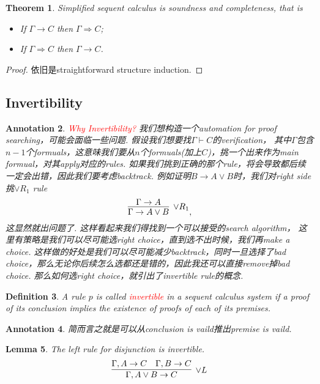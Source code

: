 \documentclass{article}
\theoremstyle{plain}
\newtheorem{theorem}{Theorem}
\newtheorem{lemma}[theorem]{Lemma}
\newtheorem{definition}[theorem]{Definition}
\newtheorem{annotation}[theorem]{Annotation}
\theoremstyle{nonumberplain}
\newtheorem{proof}{Proof}
\newcommand{\redt}[1]{\textcolor{red}{#1}}
\begin{document}
\begin{theorem}
\rm Simplified sequent calculus is soundness and completeness, that is
\begin{itemize}
	\item If $\Gamma \to C$ then $\Gamma \Rightarrow C$;
	\item If $\Gamma \Rightarrow C$ then $\Gamma \to C$.
\end{itemize}
\end{theorem}

\begin{proof}
依旧是straightforward structure induction.
\end{proof}



\newpage
\subsection{Invertibility}

\begin{annotation}
 \rm \redt{Why Invertibility?} \cite{15-317-inv} 我们想构造一个automation for proof searching，可能会面临一些问题. 假设我们想要找$\Gamma \vdash C$的verification， 其中$\Gamma$包含$n-1$个formuals，这意味我们要从$n$个formuals(加上$C$)，挑一个出来作为main formual，对其apply对应的rules. 如果我们挑到正确的那个rule，将会导致都后续一定会出错，因此我们要考虑backtrack. 例如证明$B \to A \vee B$时，我们对right side挑$\vee R_1$ rule
$$
\infer[\vee R_1]{\Gamma \to A \vee B}{\Gamma \to A},
$$ 
这显然就出问题了. 这样看起来我们得找到一个可以接受的search algorithm， 这里有策略是我们可以尽可能选right choice，直到选不出时候，我们再make a choice. 这样做的好处是我们可以尽可能减少backtrack，同时一旦选择了bad choice，那么无论你后续怎么选都还是错的，因此我还可以直接remove掉bad choice. 那么如何选right choice，就引出了invertible rule的概念. 
\end{annotation}

\begin{definition}
\rm A rule $p$ is called \redt{invertible} in a sequent calculus system if a proof of its conclusion implies the existence of proofs of each of its premises. 
\end{definition}

\begin{annotation}
\rm 简而言之就是可以从conclusion is vaild推出premise is vaild.
\end{annotation}

\begin{lemma}
\rm The left rule for disjunction is invertible.
$$
\infer[\vee L]{\Gamma, A \vee B \to C}{\Gamma, A \to C & \Gamma, B \to C}
$$
\end{lemma}
\end{document}
